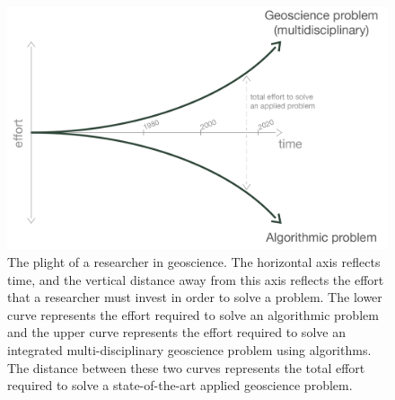 \begin{figure}
    \begin{center}
    \includegraphics[width=0.8\columnwidth]{figures/diverging-curves-08.png}
    \end{center}
\caption{
    The plight of a researcher in geoscience. The horizontal axis reflects time, and the vertical distance away from this axis reflects the effort that a researcher must invest in order to solve a problem. The lower curve represents the effort required to solve an algorithmic problem and the upper curve represents the effort required to solve an integrated multi-disciplinary geoscience problem using algorithms. The distance between these two curves represents the total effort required to solve a state-of-the-art applied geoscience problem.
}
\label{fig:diverging-curves}
\end{figure}
